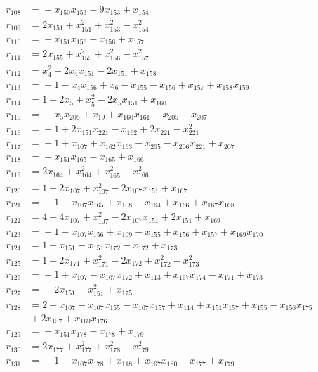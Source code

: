 \begin{align*}
r_{108} &={}-x_{150}x_{153} -9x_{153} +x_{154} \\
r_{109} &={}2x_{151} +x_{151}^{2} +x_{153}^{2} -x_{154}^{2} \\
r_{110} &={}-x_{151}x_{156} -x_{156} +x_{157} \\
r_{111} &={}2x_{155} +x_{155}^{2} +x_{156}^{2} -x_{157}^{2} \\
r_{112} &={}x_{4}^{2} -2x_{4}x_{151} -2x_{151} +x_{158} \\
r_{113} &={}-1 -x_{4}x_{156} +x_{6} -x_{155} -x_{156} +x_{157} +x_{158}x_{159} \\
r_{114} &={}1 -2x_{5} +x_{5}^{2} -2x_{5}x_{151} +x_{160} \\
r_{115} &={}-x_{5}x_{206} +x_{19} +x_{160}x_{161} -x_{205} +x_{207} \\
r_{116} &={}-1 +2x_{151}x_{221} -x_{162} +2x_{221} -x_{221}^{2} \\
r_{117} &={}-1 +x_{107} +x_{162}x_{163} -x_{205} -x_{206}x_{221} +x_{207} \\
r_{118} &={}-x_{151}x_{165} -x_{165} +x_{166} \\
r_{119} &={}2x_{164} +x_{164}^{2} +x_{165}^{2} -x_{166}^{2} \\
r_{120} &={}1 -2x_{107} +x_{107}^{2} -2x_{107}x_{151} +x_{167} \\
r_{121} &={}-1 -x_{107}x_{165} +x_{108} -x_{164} +x_{166} +x_{167}x_{168} \\
r_{122} &={}4 -4x_{107} +x_{107}^{2} -2x_{107}x_{151} +2x_{151} +x_{169} \\
r_{123} &={}-1 -x_{107}x_{156} +x_{109} -x_{155} +x_{156} +x_{157} +x_{169}x_{170} \\
r_{124} &={}1 +x_{151} -x_{151}x_{172} -x_{172} +x_{173} \\
r_{125} &={}1 +2x_{171} +x_{171}^{2} -2x_{172} +x_{172}^{2} -x_{173}^{2} \\
r_{126} &={}-1 +x_{107} -x_{107}x_{172} +x_{113} +x_{167}x_{174} -x_{171} +x_{173} \\
r_{127} &={}-2x_{151} -x_{151}^{2} +x_{175} \\
r_{128} &={}2 -x_{107} -x_{107}x_{155} -x_{107}x_{157} +x_{114} +x_{151}x_{157} +x_{155} -x_{156}x_{175} \\
&{}+2x_{157} +x_{169}x_{176} \\
r_{129} &={}-x_{151}x_{178} -x_{178} +x_{179} \\
r_{130} &={}2x_{177} +x_{177}^{2} +x_{178}^{2} -x_{179}^{2} \\
r_{131} &={}-1 -x_{107}x_{178} +x_{118} +x_{167}x_{180} -x_{177} +x_{179} \\

\end{align*}
